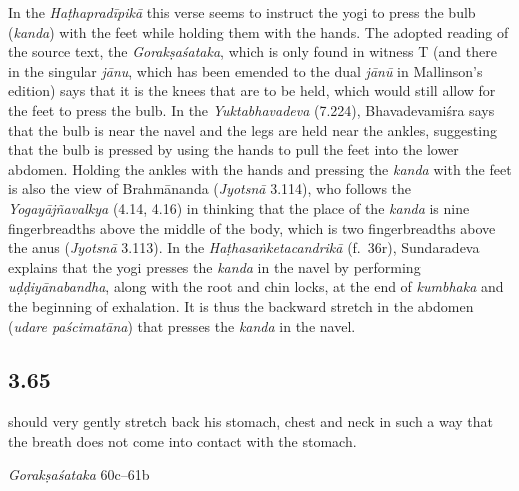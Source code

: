 \begin{ekdosis}
\begin{philcomm}[hp03_064]
In the \emph{Haṭhapradīpikā} this verse seems to instruct the yogi to press the bulb (\emph{kanda}) with the feet while holding them with the hands. The adopted reading of the source text, the \emph{Gorakṣaśataka}, which is only found in witness T (and there in the singular \emph{jānu}, which has been emended to the dual \emph{jānū} in Mallinson's edition) says that it is the knees that are to be held, which would still allow for the feet to press the bulb. In the \emph{Yuktabhavadeva} (7.224), Bhavadevamiśra says that the bulb is near the navel and the legs are held near the ankles, suggesting that the bulb is pressed by using the hands to pull the feet into the lower abdomen. Holding the ankles with the hands and pressing the \emph{kanda} with the feet is also the view of Brahmānanda (\emph{Jyotsnā} 3.114), who follows the \emph{Yogayājñavalkya} (4.14, 4.16) in thinking that the place of the \emph{kanda} is nine fingerbreadths above the middle of the body, which is two fingerbreadths above the anus (\emph{Jyotsnā} 3.113). In the \emph{Haṭhasaṅketacandrikā} (f.~36r), Sundaradeva explains that the yogi presses the \emph{kanda} in the navel by performing \emph{uḍḍiyānabandha}, along with the root and chin locks, at the end of \emph{kumbhaka} and the beginning of exhalation. It is thus the backward stretch in the abdomen (\emph{udare paścimatāna}) that presses the \emph{kanda} in the navel.

\end{philcomm}


\subsection*{3.65}
\begin{translation} should very gently stretch back his stomach, chest and neck in such a way that the breath does not come into contact with the stomach.
\end{translation}%

\begin{sources}[hp03_065]
\emph{Gorakṣaśataka} 60c–61b
\begin{versinnote}
\tl{\var{60d dhārayedd°] GU; kārye*raṃ*T, kuryāñ ca V dhṛdaye gate] \emph{em.}~Sathyanarayanan; dhṛdaye gale GUT, civukaṃ hṛdi V}\\!}%
\end{versinnote}
\end{sources}


\end{ekdosis}
